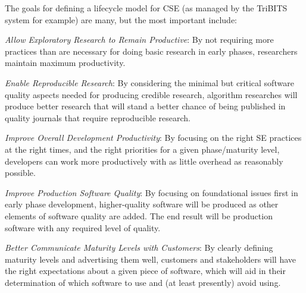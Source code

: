 \documentclass[11pt]{SANDreport}
\begin{document}




The goals for defining a lifecycle model for CSE (as managed by the
TriBITS system for example) are many, but the most important include:

\begin{compactitem}

{}\item\textit{Allow Exploratory Research to Remain Productive}: By
not requiring more practices than are necessary for doing basic
research in early phases, researchers maintain maximum productivity.

{}\item\textit{Enable Reproducible Research}: By considering the
minimal but critical software quality aspects needed for producing
credible research, algorithm researches will produce better research
that will stand a better chance of being published in quality journals
that require reproducible research.

{}\item\textit{Improve Overall Development Productivity}: By focusing
on the right SE practices at the right times, and the right priorities
for a given phase/maturity level, developers can work more
productively with as little overhead as reasonably possible.

{}\item\textit{Improve Production Software Quality}: By focusing on
foundational issues first in early phase development, higher-quality
software will be produced as other elements of software quality are
added.  The end result will be production software with any required
level of quality.

{}\item\textit{Better Communicate Maturity Levels with Customers}: By
clearly defining maturity levels and advertising them well,
customers and stakeholders will have the right expectations about a
given piece of software, which will  aid in their determination of which
software to use and (at least presently) avoid using.

\end{compactitem}
\end{document}
